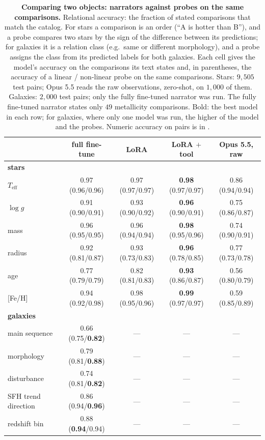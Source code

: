 \begin{table}[t]\centering\small
\caption{\textbf{Comparing two objects: narrators against probes on the same comparisons.}
Relational accuracy: the fraction of stated comparisons that match the catalog. For stars a
comparison is an order (``A is hotter than B''), and a probe compares two stars by the sign of
the difference between its predictions; for galaxies it is a relation class (e.g.\ same or
different morphology), and a probe assigns the class from its predicted labels for both
galaxies. Each cell gives the model's accuracy on the comparisons its text states and, in
parentheses, the accuracy of a linear / non-linear probe on the same comparisons.
Stars: $9{,}505$ test pairs; Opus 5.5 reads the raw
observations, zero-shot, on $1{,}000$ of them. Galaxies: $2{,}000$ test pairs; only the fully
fine-tuned narrator was run. The
fully fine-tuned narrator states only $49$ metallicity comparisons. Bold: the best model in each row; for galaxies, where only one model was run, the higher of the model and the probes. Numeric accuracy on pairs is in .}
\label{tab:pair}
\begin{tabular}{lcccc}
\toprule
 & full fine-tune & LoRA & LoRA $+$ tool & Opus 5.5, raw \\
\midrule
\multicolumn{5}{l}{\textbf{stars}}\\
$T_\mathrm{eff}$ & 0.97 (0.96/0.96) & 0.97 (0.97/0.97) & \textbf{0.98} (0.97/0.97) & 0.86 (0.94/0.94) \\
$\log g$ & 0.91 (0.90/0.91) & 0.93 (0.90/0.92) & \textbf{0.96} (0.90/0.91) & 0.75 (0.86/0.87) \\
mass & 0.96 (0.95/0.95) & 0.96 (0.94/0.94) & \textbf{0.98} (0.95/0.96) & 0.74 (0.90/0.91) \\
radius & 0.92 (0.81/0.87) & 0.93 (0.73/0.83) & \textbf{0.96} (0.78/0.85) & 0.77 (0.73/0.78) \\
age & 0.77 (0.79/0.79) & 0.82 (0.81/0.83) & \textbf{0.93} (0.86/0.87) & 0.56 (0.80/0.79) \\
{[Fe/H]} & 0.94 (0.92/0.98) & 0.98 (0.95/0.96) & \textbf{0.99} (0.97/0.97) & 0.59 (0.85/0.89) \\
\midrule
\multicolumn{5}{l}{\textbf{galaxies}}\\
main sequence & 0.66 (0.75/\textbf{0.82}) & --- & --- & --- \\
morphology & 0.79 (0.81/\textbf{0.88}) & --- & --- & --- \\
disturbance & 0.74 (0.81/\textbf{0.82}) & --- & --- & --- \\
SFH trend direction & 0.86 (0.94/\textbf{0.96}) & --- & --- & --- \\
redshift bin & 0.88 (\textbf{0.94}/0.94) & --- & --- & --- \\
\bottomrule
\end{tabular}
\end{table}


